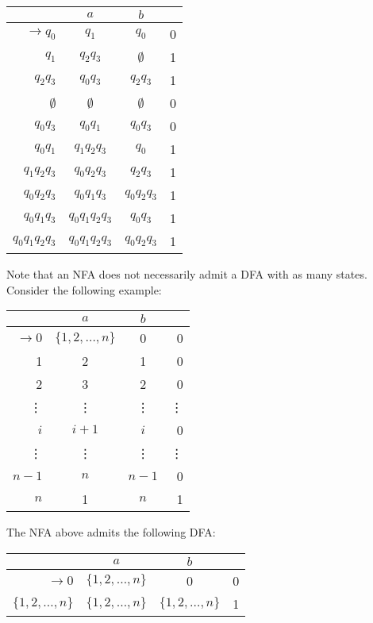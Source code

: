 \begin{center}\begin{tabular}{r|c c r}
         & \(a\) & \(b\) & \\\bottomrule
    \(\to q_0\) & \(q_1\) & \(q_0\) & 0 \\
          \(q_1\) & \(q_2q_3\) & \(\emptyset\) & 1 \\
          \(q_2q_3\) & \(q_0q_3\) & \(q_2q_3\) & 1 \\
          \(\emptyset\) & \(\emptyset\) & \(\emptyset\) & 0\\
          \(q_0q_3\) & \(q_0q_1\) & \(q_0q_3\) & 0 \\
          \(q_0q_1\) & \(q_1q_2q_3\) & \(q_0\) & 1 \\
          \(q_1q_2q_3\) & \(q_0q_2q_3\) & \(q_2q_3\) & 1 \\
          \(q_0q_2q_3\) & \(q_0q_1q_3\) & \(q_0q_2q_3\) & 1 \\
          \(q_0q_1q_3\) & \(q_0q_1q_2q_3\) & \(q_0q_3\) & 1 \\
          \(q_0q_1q_2q_3\) & \(q_0q_1q_2q_3\) & \(q_0q_2q_3\) & 1\\
\end{tabular}\end{center}

Note that an NFA does not necessarily admit a DFA with as many states. Consider the following example:

\begin{center}\begin{tabular}{r| c c r}
     & \(a\) & \(b\) & \\\bottomrule
\(\to 0\)&\(\{1,2,\hdots,n\}\) & 0 & 0 \\
     1 & 2 & 1 & 0 \\
     2 & 3 & 2 & 0 \\
     \vdots & \vdots & \vdots & \vdots \\
     \(i\) & \(i + 1\) & \(i\) & 0 \\
     \vdots & \vdots & \vdots & \vdots \\
     \(n-1\) & \(n\) & \(n-1\) & 0 \\
     \(n\) & 1 & \(n\) & 1
\end{tabular}\end{center}

The NFA above admits the following DFA:

\begin{center}\begin{tabular}{r| c c r}
     & \(a\) & \(b\) & \\\bottomrule
\(\to 0\)&\(\{1,2,\hdots,n\}\) & 0 & 0 \\
     \(\{1, 2,\hdots, n\}\) & \(\{1, 2,\hdots, n\}\) & \(\{1, 2,\hdots, n\}\) & 1 \\
\end{tabular}\end{center}

